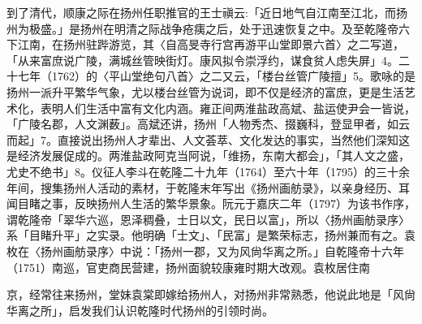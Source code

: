 到了清代，顺康之际在扬州任职推官的王士禛云:「近日地气自江南至江北，而扬州为极盛。」是扬州在明清之际战争疮痍之后，处于迅速恢复之中。及至乾隆帝六下江南，在扬州驻跸游览，其〈自高旻寺行宫再游平山堂即景六首〉之二写道，「从来富庶说广陵，满城丝管映街灯。康风拟令崇浮约，谋食贫人虑失屏」4。二十七年（1762）的〈平山堂绝句八首〉之二又云，「楼台丝管广陵擅」5。歌咏的是扬州一派升平繁华气象，尤以楼台丝管为说词，即不仅是经济的富庶，更是生活艺术化，表明人们生活中富有文化内涵。雍正间两淮盐政高斌、盐运使尹会一皆说，「广陵名郡，人文渊薮」。高斌还讲，扬州「人物秀杰、掇巍科，登显甲者，如云而起」7。直接说出扬州人才辈出、人文荟萃、文化发达的事实，当然他们深知这是经济发展促成的。两淮盐政阿克当阿说，「维扬，东南大都会」，「其人文之盛，尤史不绝书」8。仪征人李斗在乾隆二十九年（1764）至六十年（1795）的三十余年间，搜集扬州人活动的素材，于乾隆末年写出《扬州画舫录》，以亲身经历、耳闻目睹之事，反映扬州人生活的繁华景象。阮元于嘉庆二年（1797）为该书作序，谓乾隆帝「翠华六巡，恩泽稠叠，士日以文，民日以富」，所以〈扬州画舫录序〉系「目睹升平」之实录。他明确「士文」、「民富」是繁荣标志，扬州兼而有之。袁枚在〈扬州画舫录序〉中说：「扬州一郡，又为风尙华离之所。」自乾隆帝十六年（1751）南巡，官吏商民营建，扬州面貌较康雍时期大改观。袁枚居住南

\vfill
\begin{BookNotes}
\end{BookNotes}

\noindent 京，经常往来扬州，堂妹袁棠即嫁给扬州人，对扬州非常熟悉，他说此地是「风尙华离之所」，启发我们认识乾隆时代扬州的引领时尚。

